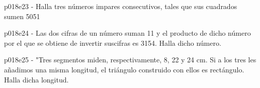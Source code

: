 \documentclass[spanish, 11pt]{exam}
\begin{document}
\begin{questions}
\begin{multicols}{2}
\begin{parts}
        \end{parts}
        \end{multicols}
        \question p018e23 - Halla tres números impares consecutivos, tales que sus cuadrados sumen 5051
        \begin{multicols}{2} 
        \end{multicols}
        \question p018e24 - Las dos cifras de un número suman 11 y el producto de dicho número por el que se obtiene de invertir suscifras es 3154. Halla dicho número.
        \begin{multicols}{2} 
        \end{multicols}
        \question p018e25 - "Tres segmentos miden, respectivamente, 8, 22 y 24 cm. 
Si a los tres les añadimos una misma longitud, el triángulo construido con ellos es rectángulo. Halla dicha longitud.
        \begin{multicols}{2} 

\end{multicols}
\end{questions}
\end{document}
